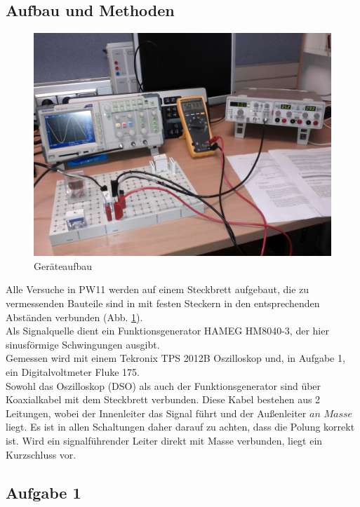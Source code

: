 \documentclass[12pt,a4paper]{article}
\begin{document}
\begin{multicols}{2}
\section{Aufbau und Methoden}
\begin{figure}[H]
	\centering
	\includegraphics[scale=0.15]{./figure/Aufbau1.jpg}
	\caption{Geräteaufbau}
	\label{fig:aufbau1}
\end{figure}
Alle Versuche in PW11 werden auf einem Steckbrett aufgebaut, die zu vermessenden Bauteile sind in mit festen Steckern in den entsprechenden Abständen verbunden (Abb. \ref{fig:aufbau1}).\\
Als Signalquelle dient ein Funktionsgenerator HAMEG HM8040-3, der hier sinusförmige Schwingungen ausgibt.\\
Gemessen wird mit einem Tekronix TPS 2012B Oszilloskop und, in Aufgabe 1, ein Digitalvoltmeter Fluke 175.\\
Sowohl das Oszilloskop (DSO) als auch der Funktionsgenerator sind über Koaxialkabel mit dem Steckbrett verbunden. Diese Kabel bestehen aus 2 Leitungen, wobei der Innenleiter das Signal führt und der Außenleiter $an$ $Masse$ liegt. Es ist in allen Schaltungen daher darauf zu achten, dass die Polung korrekt ist. Wird ein signalführender Leiter direkt mit Masse verbunden, liegt ein Kurzschluss vor.\\



\subsection{Aufgabe 1}


\end{multicols}
\end{document}
